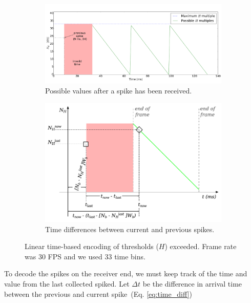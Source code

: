 \documentclass[conference]{IEEEtran}
\begin{document}
\begin{figure}[htb]
  \centering
      
    \begin{subfigure}[b]{0.49\textwidth}
      \includegraphics[width=\textwidth]{spike_values_linear}
      \caption{Possible values after a spike has been received.}
      \label{fig:linear_time_all}
    \end{subfigure}
    
    \begin{subfigure}[b]{0.45\textwidth}
      \includegraphics[width=\textwidth]{new_val_calc_linear}
      \caption{Time differences between current and previous spikes.}
      \label{fig:linear_time_calc}
    \end{subfigure}
  \caption{Linear time-based encoding of thresholds ($H$) exceeded.  Frame rate was 30 FPS and we used 33 time bins.}
  \label{fig:linear_time}
\end{figure} 

To decode the spikes on the receiver end, we must keep track of the time and value from the last collected spiked. Let $\Delta t$ be the difference in arrival time between the previous and current spike~(Eq. \ref{eq:time_diff})
\end{document}
